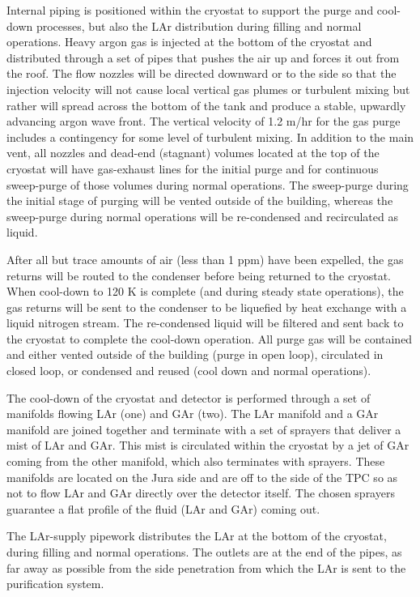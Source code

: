 Internal piping is positioned within the cryostat to support the purge and cool-down processes, but also the LAr distribution during filling and normal operations. Heavy argon gas is injected at the bottom of the cryostat and distributed through a set of pipes that pushes the air up and forces it out from the roof. The flow nozzles will be directed downward or to the side so that the injection velocity will not cause local vertical gas plumes or turbulent mixing but rather will spread across the bottom of the tank and produce a stable, upwardly advancing argon wave front. The vertical velocity of 1.2 m/hr for the gas purge includes a contingency for some level of turbulent mixing. In addition to the main vent, all nozzles and dead-end (stagnant) volumes located at the top of the cryostat will have gas-exhaust lines for the initial purge and for continuous sweep-purge of those volumes during normal operations. The sweep-purge during the initial stage of purging will be vented outside of the building, whereas the sweep-purge during normal operations will be re-condensed and recirculated as liquid. 

After all but trace amounts of air (less than 1 ppm) have been expelled, the gas returns will be routed to the condenser before being returned to the cryostat. When cool-down to 120 K is complete (and during steady state operations), the gas returns will be sent to the condenser to be liquefied by heat exchange with a liquid nitrogen stream. The re-condensed liquid will be filtered and sent back to the cryostat to complete the cool-down operation. All purge gas will be contained and either vented outside of the building (purge in open loop), circulated in closed loop, or condensed and reused (cool down and normal operations).

The cool-down of the cryostat and detector is performed through a set of manifolds flowing LAr (one) and GAr (two). The LAr manifold and a GAr manifold are joined together and terminate with a set of sprayers that deliver a mist of LAr and GAr. This mist is circulated within the cryostat by a jet of GAr coming from the other manifold, which also terminates with sprayers. These manifolds are located on the Jura side and are off to the side of the TPC so as not to flow LAr and GAr directly over the detector itself. The chosen sprayers guarantee a flat profile of the fluid (LAr and GAr) coming out.

The LAr-supply pipework distributes the LAr at the bottom of the cryostat, during filling and normal operations. The outlets are at the end of the pipes, as far away as possible from the side penetration from which the LAr is sent to the purification system.

